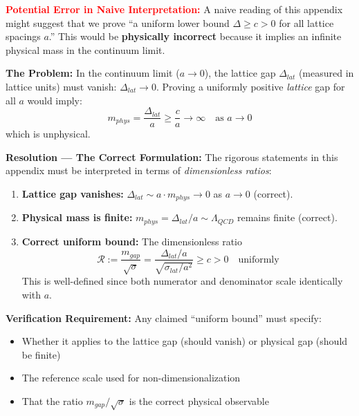 \begin{remark}\label{rem:vanishing_gap}
\textcolor{red}{\textbf{Potential Error in Naive Interpretation:}} A naive reading of this appendix might suggest that we prove ``a uniform lower bound $\Delta \geq c > 0$ for all lattice spacings $a$.'' This would be \textbf{physically incorrect} because it implies an infinite physical mass in the continuum limit.

\textbf{The Problem:} In the continuum limit ($a \to 0$), the lattice gap $\Delta_{lat}$ (measured in lattice units) must vanish: $\Delta_{lat} \to 0$. Proving a uniformly positive \emph{lattice} gap for all $a$ would imply:
\begin{equation}
    m_{phys} = \frac{\Delta_{lat}}{a} \geq \frac{c}{a} \to \infty \quad \text{as } a \to 0
\end{equation}
which is unphysical.

\textbf{Resolution --- The Correct Formulation:} The rigorous statements in this appendix must be interpreted in terms of \emph{dimensionless ratios}:
\begin{enumerate}
    \item \textbf{Lattice gap vanishes:} $\Delta_{lat} \sim a \cdot m_{phys} \to 0$ as $a \to 0$ (correct).
    
    \item \textbf{Physical mass is finite:} $m_{phys} = \Delta_{lat}/a \sim \Lambda_{QCD}$ remains finite (correct).
    
    \item \textbf{Correct uniform bound:} The dimensionless ratio
    \begin{equation}
        \boxed{\mathcal{R} := \frac{m_{gap}}{\sqrt{\sigma}} = \frac{\Delta_{lat}/a}{\sqrt{\sigma_{lat}/a^2}} \geq c > 0 \quad \text{uniformly}}
    \end{equation}
    This is well-defined since both numerator and denominator scale identically with $a$.
\end{enumerate}

\textbf{Verification Requirement:} Any claimed ``uniform bound'' must specify:
\begin{itemize}
    \item Whether it applies to the lattice gap (should vanish) or physical gap (should be finite)
    \item The reference scale used for non-dimensionalization
    \item That the ratio $m_{gap}/\sqrt{\sigma}$ is the correct physical observable
\end{itemize}
\end{remark}

